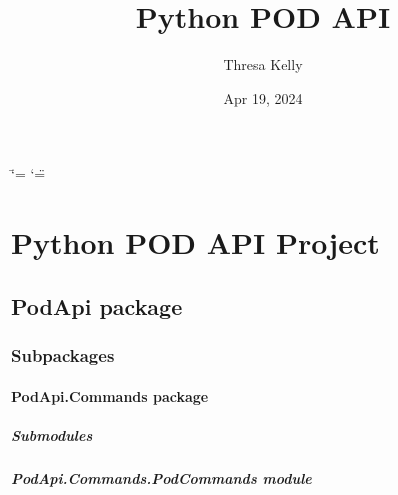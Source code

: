 \documentclass[letterpaper,10pt,english]{sphinxmanual}
\title{Python POD API}
\date{Apr 19, 2024}
\author{Thresa Kelly}
\begin{document}
\ifdefined\shorthandoff
  \ifnum\catcode`\=\string=\active\shorthandoff{=}\fi
  \ifnum\catcode`\"=\active{}\fi
\fi

\pagestyle{empty}
\sphinxmaketitle
\pagestyle{plain}
\sphinxtableofcontents
\pagestyle{normal}
\label{\detokenize{index::doc}}


\sphinxstepscope


\chapter{Python POD API Project}
\label{\detokenize{modules:python-pod-api-project}}\label{\detokenize{modules::doc}}
\sphinxstepscope


\section{PodApi package}
\label{\detokenize{PodApi:podapi-package}}\label{\detokenize{PodApi::doc}}

\subsection{Subpackages}
\label{\detokenize{PodApi:subpackages}}
\sphinxstepscope


\subsubsection{PodApi.Commands package}
\label{\detokenize{PodApi.Commands:podapi-commands-package}}\label{\detokenize{PodApi.Commands::doc}}

\paragraph{Submodules}
\label{\detokenize{PodApi.Commands:submodules}}

\paragraph{PodApi.Commands.PodCommands module}
\label{\detokenize{PodApi.Commands:module-PodApi.Commands.PodCommands}}\label{\detokenize{PodApi.Commands:podapi-commands-podcommands-module}}
\end{document}
